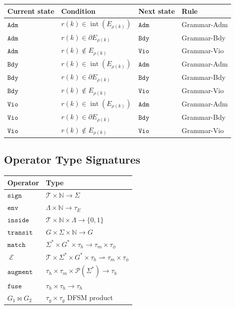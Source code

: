 \documentclass[11pt,a4paper]{article}
\theoremstyle{plain}
\theoremstyle{definition}
\theoremstyle{remark}
\DeclareMathOperator{\Endo}{\mathcal{E}}
\DeclareMathOperator{\interior}{int}
\newcommand{\N}{\mathbb{N}}
\newcommand{\B}{\{0,1\}}
\begin{document}
\begin{center}
\begin{tabular}{llll}
\toprule
\textbf{Current state} & \textbf{Condition} & \textbf{Next state} & \textbf{Rule} \\
\midrule
$\mathtt{Adm}$ & $r(k) \in \interior(E_{\rho(k)})$ & $\mathtt{Adm}$ & Grammar-Adm \\
$\mathtt{Adm}$ & $r(k) \in \partial E_{\rho(k)}$ & $\mathtt{Bdy}$ & Grammar-Bdy \\
$\mathtt{Adm}$ & $r(k) \notin E_{\rho(k)}$ & $\mathtt{Vio}$ & Grammar-Vio \\
$\mathtt{Bdy}$ & $r(k) \in \interior(E_{\rho(k)})$ & $\mathtt{Adm}$ & Grammar-Adm \\
$\mathtt{Bdy}$ & $r(k) \in \partial E_{\rho(k)}$ & $\mathtt{Bdy}$ & Grammar-Bdy \\
$\mathtt{Bdy}$ & $r(k) \notin E_{\rho(k)}$ & $\mathtt{Vio}$ & Grammar-Vio \\
$\mathtt{Vio}$ & $r(k) \in \interior(E_{\rho(k)})$ & $\mathtt{Adm}$ & Grammar-Adm \\
$\mathtt{Vio}$ & $r(k) \in \partial E_{\rho(k)}$ & $\mathtt{Bdy}$ & Grammar-Bdy \\
$\mathtt{Vio}$ & $r(k) \notin E_{\rho(k)}$ & $\mathtt{Vio}$ & Grammar-Vio \\
\bottomrule
\end{tabular}
\end{center}

\subsection*{Operator Type Signatures}

\begin{center}
\begin{tabular}{ll}
\toprule
\textbf{Operator} & \textbf{Type} \\
\midrule
$\mathtt{sign}$ & $\mathcal{T} \times \N \to \Sigma$ \\
$\mathtt{env}$ & $\Lambda \times \N \to \tau_E$ \\
$\mathtt{inside}$ & $\mathcal{T} \times \N \times \Lambda \to \B$ \\
$\mathtt{transit}$ & $G \times \Sigma \times \N \to G$ \\
$\mathtt{match}$ & $\Sigma^* \times G^* \times \tau_h \to \tau_m \times \tau_\phi$ \\
$\Endo$ & $\mathcal{T} \times \Sigma^* \times G^* \times \tau_h \rightharpoonup \tau_m \times \tau_\phi$ \\
$\mathtt{augment}$ & $\tau_h \times \tau_m \times \mathcal{P}(\Sigma^*) \to \tau_h$ \\
$\mathtt{fuse}$ & $\tau_h \times \tau_h \to \tau_h$ \\
$G_1 \bowtie G_2$ & $\tau_g \times \tau_g$ DFSM product \\
\bottomrule
\end{tabular}
\end{center}
\end{document}
